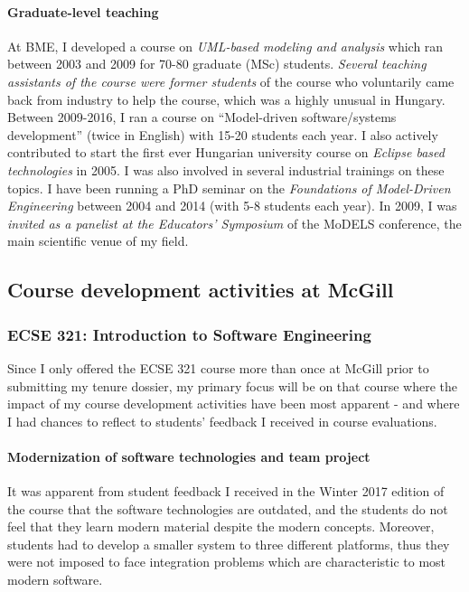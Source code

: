 \paragraph{Graduate-level teaching}
At BME, I developed a course on \emph{UML-based modeling and analysis} which ran between 2003 and 2009 for 70-80 graduate (MSc) students. \emph{Several teaching assistants of the course were former students} of the course who voluntarily came back from industry to help the course, which was a highly unusual in Hungary. Between 2009-2016, I ran a course on “Model-driven software/systems development” (twice in English) with 15-20 students each year. I also actively contributed to start the first ever Hungarian university course on \emph{Eclipse based technologies} in 2005. I was also involved in several industrial trainings on these topics. I have been running a PhD seminar on the \emph{Foundations of Model-Driven Engineering} between 2004 and 2014 (with 5-8 students each year). In 2009, I was \emph{invited as a panelist at the Educators' Symposium} of the MoDELS conference, the main scientific venue of my field. 


\subsection{Course development activities at McGill}


\subsubsection{ECSE 321: Introduction to Software Engineering}

Since I only offered the ECSE 321 course more than once at McGill prior to submitting my tenure dossier, my primary focus will be on that course where the impact of my course development activities have been most apparent - and where I had chances to reflect to students' feedback I received in course evaluations.  



\paragraph{Modernization of software technologies and team project}
It was apparent from student feedback I received in the Winter 2017 edition of the course that the software technologies are outdated, and the students do not feel that they learn modern material despite the modern concepts. Moreover, students had to develop a smaller system to three different platforms, thus they were not imposed to face integration problems which are characteristic to most modern software.

